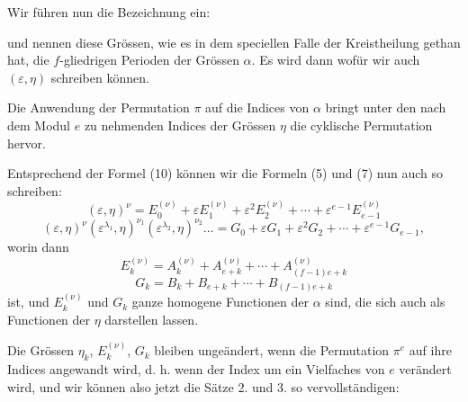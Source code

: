 
Wir führen nun die Bezeichnung ein:

und nennen diese Grössen, wie es  in dem speciellen Falle der Kreistheilung gethan hat, die $f$-gliedrigen Perioden der Grössen $\alpha$. Es wird dann
wofür wir auch $(\varepsilon,\eta)$ schreiben können.

Die Anwendung der Permutation $\pi$ auf die Indices von $\alpha$ bringt unter den nach dem Modul $e$ zu nehmenden Indices der Grössen $\eta$ die cyklische Permutation
hervor.

Entsprechend der Formel (10) können wir die Formeln (5) und (7) nun auch so schreiben:
\[
(\varepsilon,\eta)^{\nu} = E_0^{(\nu)} + \varepsilon E_1^{(\nu)} + \varepsilon^2 E_2^{(\nu)} + \cdots + \varepsilon^{e-1}E_{e-1}^{(\nu)}
\]
\[
(\varepsilon,\eta)^{\nu}(\varepsilon^{\lambda_1},\eta)^{\nu_1}(\varepsilon^{\lambda_2},\eta)^{\nu_2}\dots = G_0 + \varepsilon G_1 + \varepsilon^2 G_2 + \cdots + \varepsilon^{e-1}G_{e-1},
\]
worin dann
\[
E_k^{(\nu)} = A_k^{(\nu)} + A_{e+k}^{(\nu)} + \cdots + A_{(f-1)e+k}^{(\nu)}
\]
\[
G_k = B_k + B_{e+k} + \cdots + B_{(f-1)e+k}
\]
ist, und $E_k^{(\nu)}$ und $G_k$ ganze homogene Functionen der $\alpha$ sind, die sich auch als Functionen der $\eta$ darstellen lassen.

Die Grössen $\eta_k$, $E_k^{(\nu)}$, $G_k$ bleiben ungeändert, wenn die Permutation $\pi^e$ auf ihre Indices angewandt wird, d. h. wenn der Index um ein Vielfaches von $e$ verändert wird, und wir können also jetzt die Sätze 2. und 3. so vervollständigen:

